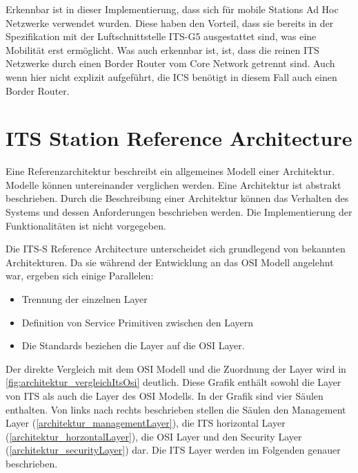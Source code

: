 Erkennbar ist in dieser Implementierung, dass sich für mobile Stations Ad Hoc Netzwerke verwendet wurden. Diese haben den Vorteil, dass sie bereits in der Spezifikation mit der Luftschnittstelle ITS-G5 ausgestattet sind, was eine Mobilität erst ermöglicht. Was auch erkennbar ist, ist, dass die reinen ITS Netzwerke durch einen Border Router vom Core Network getrennt sind. Auch wenn hier nicht explizit aufgeführt, die \ac{ICS} benötigt in diesem Fall auch einen Border Router.

 
\section{ITS Station Reference Architecture}
Eine Referenzarchitektur beschreibt ein allgemeines Modell einer Architektur. Modelle können untereinander verglichen werden. Eine Architektur ist abstrakt beschrieben. Durch die Beschreibung einer Architektur können das Verhalten des Systems und dessen Anforderungen beschrieben werden. Die Implementierung der Funktionalitäten ist nicht vorgegeben. 

Die \ac{ITS-S} Reference Architecture unterscheidet sich grundlegend von bekannten Architekturen. Da sie während der Entwicklung an das \ac{OSI} Modell angelehnt war, ergeben sich einige Parallelen:
\begin{itemize}
	\item Trennung der einzelnen Layer
	\item Definition von Service Primitiven zwischen den Layern
	\item Die Standards beziehen die Layer auf die \ac{OSI} Layer. 
\end{itemize}

Der direkte Vergleich mit dem \ac{OSI} Modell und die Zuordnung der Layer wird in \autoref{fig:architektur_vergleichItsOsi} deutlich. Diese Grafik enthält sowohl die Layer von \ac{ITS} als auch die Layer des \ac{OSI} Modells. In der Grafik sind  vier Säulen enthalten. Von links nach rechts beschrieben stellen die Säulen den Management Layer  (\autoref{architektur_managementLayer}), die \ac{ITS} horizontal Layer (\autoref{architektur_horzontalLayer}), die \ac{OSI} Layer und den Security Layer (\autoref{architektur_securityLayer}) dar. Die \ac{ITS} Layer werden im Folgenden genauer beschrieben. 

